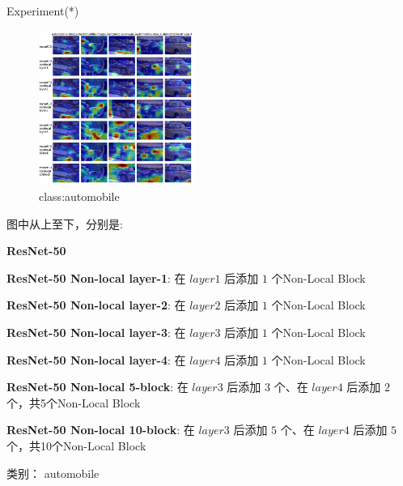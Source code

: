 \begin{frame}{Experiment(*)}
    \begin{multicols}{2}
    \begin{figure}
        \centering
        \includegraphics[width=0.45\textwidth]{docs/paperReading/Non-local/exp/automobile.png}
        \caption{class:automobile}
    \end{figure}

    \begin{scriptsize}
        图中从上至下，分别是:

        \begin{tiny}
            \textbf{ResNet-50}

            \textbf{ResNet-50 Non-local layer-1}: 在 $layer1$ 后添加 $1$ 个Non-Local Block

            \textbf{ResNet-50 Non-local layer-2}: 在 $layer2$ 后添加 $1$ 个Non-Local Block

            \textbf{ResNet-50 Non-local layer-3}: 在 $layer3$ 后添加 $1$ 个Non-Local Block
            
            \textbf{ResNet-50 Non-local layer-4}: 在 $layer4$ 后添加 $1$ 个Non-Local Block
            
            \textbf{ResNet-50 Non-local 5-block}: 在 $layer3$ 后添加 $3$ 个、在 $layer4$ 后添加 $2$ 个，共5个Non-Local Block
            
            \textbf{ResNet-50 Non-local 10-block}: 在 $layer3$ 后添加 $5$ 个、在 $layer4$ 后添加 $5$ 个，共10个Non-Local Block
        \end{tiny}

        类别： automobile 
    \end{scriptsize}
\end{multicols}
\end{frame}

